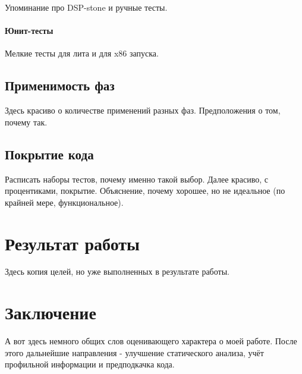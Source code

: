 \documentclass[12pt,a4paper]{article}
\begin{document}
Упоминание про DSP-stone и ручные тесты.

\paragraph{Юнит-тесты}

Мелкие тесты для лита и для x86 запуска.

\subsection{Применимость фаз}

Здесь красиво о количестве применений разных фаз. Предположения о том, почему так.

\subsection{Покрытие кода}

Расписать наборы тестов, почему именно такой выбор. Далее красиво, с процентиками, покрытие. Объяснение, почему хорошее, но не идеальное (по крайней мере, функциональное).

\section{Результат работы}

Здесь копия целей, но уже выполненных в результате работы.

\section{Заключение}

А вот здесь немного общих слов оценивающего характера о моей работе. После этого дальнейшие направления - улучшение статического анализа, учёт профильной информации и предподкачка кода.
\end{document}
